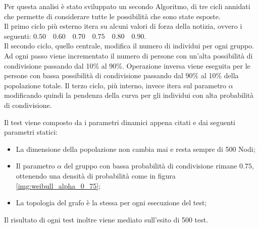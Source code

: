 Per questa analisi è stato sviluppato un secondo Algoritmo, di tre cicli annidati che permette di considerare
tutte le possibilità che sono state esposte.\\
Il primo ciclo più esterno itera su alcuni valori di forza della notizia, 
ovvero i seguenti: $0.50 \quad 0.60 \quad 0.70 \quad 0.75 \quad 0.80 \quad 0.90$.\\
Il secondo ciclo, quello centrale, modifica il numero di individui per ogni gruppo. 
Ad ogni passo viene incrementato il numero di persone con un'alta possibilità di condivisione 
passando dal 10\% al 90\%. Operazione inversa viene eseguita per le persone con bassa possibilità di 
condivisione passando dal 90\% al 10\% della popolazione totale.
Il terzo ciclo, più interno, invece itera sul parametro $\alpha$ modificando quindi la pendenza della 
curva per gli individui con alta probabilità di condivisione.

Il test viene composto da i parametri dinamici appena citati e dai seguenti parametri statici:
\begin{itemize}
\item La dimensione della popolazione non cambia mai e resta sempre di 500 Nodi;
\item Il parametro $\alpha$ del gruppo con bassa probabilità di condivisione rimane $0.75$, 
ottenendo una densità di probabilità come in figura \ref{img:weibull_alpha_0_75};
\item La topologia del grafo è la stessa per ogni esecuzione del test;
\end{itemize}

Il risultato di ogni test inoltre viene mediato sull'esito di 500 test.


















